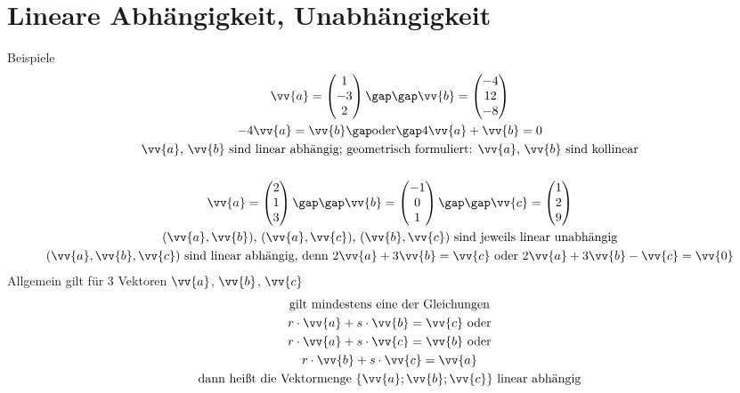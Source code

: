 \section{Lineare Abhängigkeit, Unabhängigkeit}
Beispiele
\begin{gather*}
  \vv{a} = \begin{pmatrix}1 \\ -3 \\ 2\end{pmatrix} \gap\gap \vv{b} = \begin{pmatrix}-4 \\ 12 \\ -8\end{pmatrix} \\
  -4\vv{a} = \vv{b} \gap\text{oder}\gap 4\vv{a} + \vv{b} = 0 \\
  \text{$\vv{a}$, $\vv{b}$ sind linear abhängig; geometrisch formuliert: $\vv{a}$, $\vv{b}$ sind kollinear} \\\\
  \vv{a} = \begin{pmatrix}2 \\ 1 \\ 3\end{pmatrix} \gap\gap \vv{b} = \begin{pmatrix}-1 \\ 0 \\ 1\end{pmatrix} \gap\gap \vv{c} = \begin{pmatrix}1 \\ 2 \\ 9\end{pmatrix} \\
  \text{$(\vv{a}, \vv{b})$, $(\vv{a}, \vv{c})$, $(\vv{b}, \vv{c})$ sind jeweils linear unabhängig} \\
  \text{$(\vv{a}, \vv{b}, \vv{c})$ sind linear abhängig, denn $2\vv{a} + 3\vv{b} = \vv{c}$ oder $2\vv{a} + 3\vv{b} - \vv{c} = \vv{0}$}
\end{gather*}
Allgemein gilt für 3 Vektoren $\vv{a}$, $\vv{b}$, $\vv{c}$
\begin{gather*}
  \text{gilt mindestens eine der Gleichungen} \\
  r \cdot \vv{a} + s \cdot \vv{b} = \vv{c} \text{ oder} \\
  r \cdot \vv{a} + s \cdot \vv{c} = \vv{b} \text{ oder} \\
  r \cdot \vv{b} + s \cdot \vv{c} = \vv{a} \\
  \text{dann heißt die Vektormenge $\left\{\vv{a}; \vv{b}; \vv{c}\right\}$ linear abhängig}
\end{gather*}
